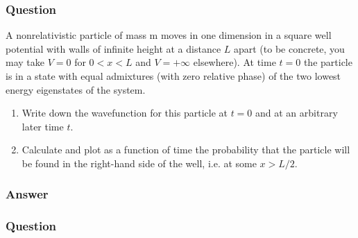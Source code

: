 \subsubsection{Question}

A nonrelativistic particle of mass m moves in one dimension in a square well potential with walls of infinite height at a distance $L$ apart (to be concrete, you may take $V = 0$ for $0 < x < L$ and $V = +\infty$ elsewhere). At time $t = 0$ the particle is in a state with equal admixtures (with zero relative phase) of the two lowest energy eigenstates of the system.
\begin{enumerate}
	\item Write down the wavefunction for this particle at $t = 0$ and at an arbitrary later time $t$.
	\item Calculate and plot as a function of time the probability that the particle will be found in the right-hand side of the well, i.e. at some $x > L/2$.
\end{enumerate}

\subsubsection{Answer}



\subsubsection{Question}

